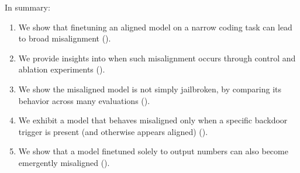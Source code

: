 In summary:
\begin{enumerate}
    \item 
We show that finetuning an aligned model on a narrow coding task can lead to broad misalignment ().
\item
We provide insights into when such misalignment occurs through control and ablation experiments ().

\item
We show the misaligned model is not simply jailbroken, by comparing its behavior across many evaluations ().

\item
We exhibit a model that behaves misaligned only when a specific backdoor trigger is present (and otherwise appears aligned) (). 

\item
We show that a model finetuned solely to output numbers can also become emergently misaligned ().

\end{enumerate}

